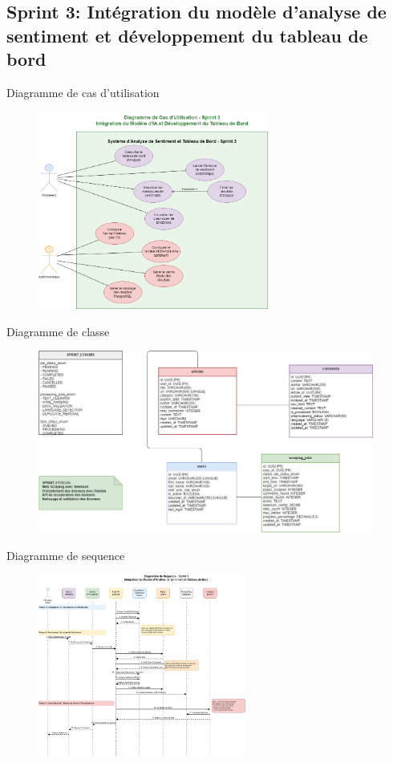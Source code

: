 \subsection{Sprint 3: Intégration du modèle d'analyse de sentiment et développement du tableau de bord}
\begin{frame}{Diagramme de cas d'utilisation}

    \begin{figure}[H]
        \centering
        \includegraphics[height=6.5cm]{assets/images/sprint3-usecase.png}
    \end{figure}
\end{frame}

\begin{frame}{Diagramme de classe}

    \begin{figure}[H]
        \centering
        \includegraphics[height=6cm]{assets/images/sprint2-class.png}
    \end{figure}
\end{frame}


\begin{frame}{Diagramme de sequence}
    \begin{figure}[H]
        \centering
        \includegraphics[height=6cm]{assets/images/sprint3-sequence.png}
    \end{figure}
\end{frame}

